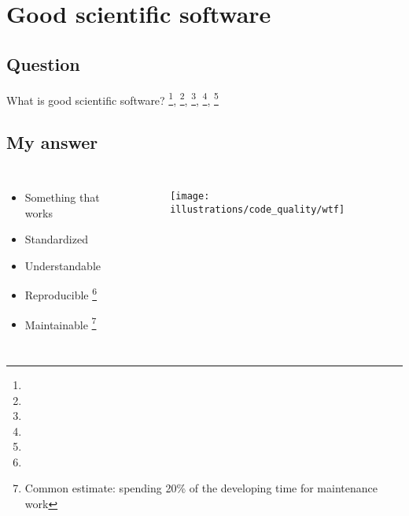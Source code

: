 \documentclass[usenames,dvipsnames]{beamer}
\theoremstyle{plain}
\theoremstyle{definition}
\begin{document}
\section{Good scientific software}
\subsection{Question}

\begin{frame}{\setframetitle{}}
  {
    \centering \Large What is good scientific software?
    \newline 
    \footnote{}, \footnote{}, \footnote{}, \footnote{}, \footnote{}
  }
\end{frame}




\subsection{My answer}



\begin{frame}{\setframetitle{}}
  {
    \begin{columns}[t]
      \begin{itemize}
      \item Something that works
      \item Standardized
      \item Understandable
      \item Reproducible \footnote{}
      \item
\renewcommand{\thefootnote}{\fnsymbol{footnote}}
Maintainable \footnote{Common estimate: spending 20\% of the developing time
        for maintenance work }
      \end{itemize}
 \begin{figure}
        \captionsetup[subfigure]{justification=centering}
        \centering
        \subcaptionbox{}
        {\texttt{[image: illustrations/code\_quality/wtf]}}
      \end{figure}
    \end{columns}
}


\end{frame}
\end{document}
